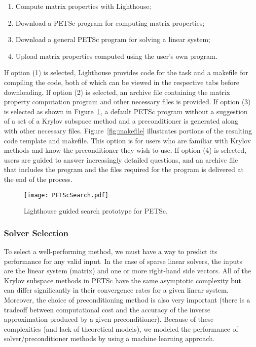 \documentclass{sig-alternate}
\begin{document}
\begin{enumerate}
    \item Compute matrix properties with Lighthouse;
    \item Download a PETSc program for computing matrix properties;
    \item Download a general PETSc program for solving a linear system;
    \item Upload matrix properties computed using the user's own program.
\end{enumerate}

If option (1) is selected, Lighthouse provides code for the task and a makefile for compiling the code, both of which can be viewed in the
respective tabs before downloading. If option (2) is selected, an archive file containing the matrix property
computation program and other necessary files is provided. If option (3) is selected as shown in Figure~\ref{fig:petsc}, a default
PETSc program without a suggestion of a set of a Krylov subspace method and a preconditioner is generated
along with other necessary files. Figure~\ref{fig:makefile} illustrates portions of the resulting code template and makefile.
This option is for users who are familiar with Krylov methods and know the preconditioner they wish to use. If option (4) is selected,
users are guided to answer increasingly detailed questions, and an archive file that includes the program and the files required for the
program is delivered at the end of the process.

\begin{figure}[ht]
\centering
\texttt{[image: PETScSearch.pdf]}
\vspace{-5pt}
\caption{Lighthouse guided search prototype for PETSc.}
\label{fig:petsc}
\end{figure}


\subsubsection{Solver Selection}
To select a well-performing method, we must have a way to predict its performance for any valid input. In the case of sparse linear solvers,
the inputs are the linear system (matrix) and one or more right-hand side vectors. All of the Krylov subspace methods in PETSc have the
same asymptotic complexity but can differ significantly in their convergence rates for a given linear system. 
Moreover, the choice of preconditioning method is 
also very important (there is a tradeoff between computational cost and the accuracy of the inverse approximation produced by a given preconditioner).
Because of these complexities (and lack of theoretical models), we modeled the performance of solver/preconditioner methods by using a 
machine learning approach.
\end{document}

